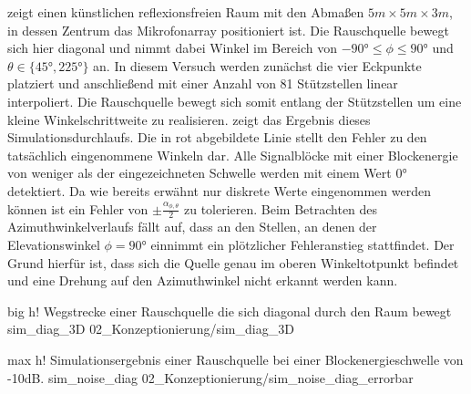  zeigt einen künstlichen reflexionsfreien Raum mit den Abmaßen $5m \times 5m \times 3m$, in dessen Zentrum das Mikrofonarray positioniert ist. Die Rauschquelle bewegt sich hier diagonal und nimmt dabei Winkel im Bereich von $-90° \leq \phi \leq 90°$ und $\theta \in \{45°,225°\}$ an. In diesem Versuch werden zunächst die vier Eckpunkte platziert und anschließend mit einer Anzahl von 81 Stützstellen linear interpoliert. Die Rauschquelle bewegt sich somit entlang der Stützstellen um eine kleine Winkelschrittweite zu realisieren.  zeigt das Ergebnis dieses Simulationsdurchlaufs. Die in rot abgebildete Linie stellt den Fehler zu den tatsächlich eingenommene Winkeln dar. Alle Signalblöcke mit einer Blockenergie von weniger als der eingezeichneten Schwelle werden mit einem Wert $0°$ detektiert. Da wie bereits erwähnt nur diskrete Werte eingenommen werden können ist ein Fehler von $\pm \frac{\alpha_{\phi, \theta}}{2}$ zu tolerieren. Beim Betrachten des Azimuthwinkelverlaufs fällt auf, dass an den Stellen, an denen der Elevationswinkel $\phi=90°$ einnimmt ein plötzlicher Fehleranstieg stattfindet. Der Grund hierfür ist, dass sich die Quelle genau im oberen Winkeltotpunkt befindet und eine Drehung auf den Azimuthwinkel nicht erkannt werden kann. 




         {big}                                                       %
         {h!}                                                  %
         {Wegstrecke einer Rauschquelle  die sich diagonal durch den Raum bewegt}    %
         {sim_diag_3D}                                               %
         {02_Konzeptionierung/sim_diag_3D}  




         {max}                                                       %
         {h!}                                                  %
         {Simulationsergebnis einer Rauschquelle  bei einer Blockenergieschwelle von -10dB.}    %
         {sim_noise_diag}                                               %
         {02_Konzeptionierung/sim_noise_diag_errorbar}   



